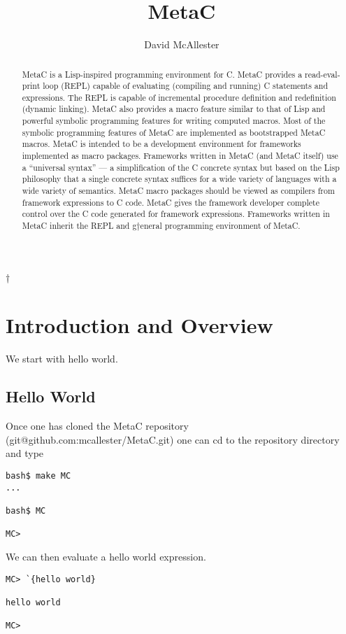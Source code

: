 \documentclass{article}
\title{MetaC}
\author{David McAllester}
\begin{document}
\maketitle
†
\begin{abstract}
  MetaC is a Lisp-inspired programming environment for C. MetaC provides a read-eval-print loop (REPL) capable of evaluating (compiling and running)
  C statements and expressions.  The REPL is capable of incremental procedure definition and redefinition (dynamic linking).  MetaC also provides
  a macro feature similar to that of Lisp and powerful symbolic programming features for writing computed macros.  Most of the symbolic programming features of
  MetaC are implemented as bootstrapped MetaC macros.  MetaC is intended to be a development environment for frameworks implemented as
  macro packages. Frameworks written in MetaC (and MetaC itself) use a ``universal syntax'' ---
  a simplification of the C concrete syntax but based on the Lisp philosophy that a single concrete syntax suffices for a wide variety of languages with
  a wide variety of semantics.  MetaC macro packages
  should be viewed as compilers from framework expressions to C code.  MetaC gives the framework developer complete control over the C code
  generated for framework expressions.  Frameworks written in MetaC inherit the REPL and g†eneral programming environment of MetaC.
\end{abstract}

\section{Introduction and Overview}

We start with hello world.

\subsection{Hello World}

Once one has cloned the MetaC repository (git@github.com:mcallester/MetaC.git) one can cd to the repository directory and type 

\begin{verbatim}
bash$ make MC
...

bash$ MC

MC>
\end{verbatim}

We can then evaluate a hello world expression.

\begin{verbatim}
MC> `{hello world}

hello world

MC>
\end{verbatim}
\end{document}
